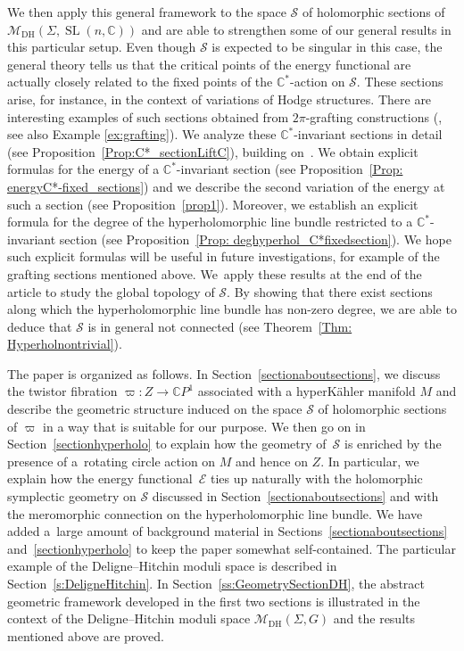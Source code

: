 \documentclass[pdftex]{sigma}
\numberwithin{equation}{section}
\theoremstyle{definition}
\newcommand\C{{\mathbb C}}
\begin{document}
We then apply this general framework to the space $\mathcal S$ of holomorphic sections of $\mathcal{M}_{\mathrm{DH}}(\Sigma,\allowbreak \operatorname{SL}(n,\C))$ and are able to strengthen some of our general results in this particular setup. Even
though $\mathcal S$ is expected to be singular in this case, the general theory tells us that the critical points
of the energy functional are actually closely related to the fixed points of the $\C^*$-action on $\mathcal S$. These sections arise, for instance, in the context of variations of Hodge structures. There are interesting examples of such sections obtained from $2\pi$-grafting constructions (\cite{Hel}, see also Example \ref{ex:grafting}). We analyze
these $\C^*$-invariant sections in detail (see Proposition~\ref{Prop:C*_sectionLiftC}), building on~\cite{CollierWentworth}. We obtain explicit formulas for the energy of a $\C^*$-invariant section
(see Proposition~\ref{Prop: energyC*-fixed_sections}) and we describe the second variation of the energy at such a
section (see Proposition~\ref{prop1}). Moreover, we establish an explicit formula for the degree of the hyperholomorphic
line bundle restricted to a $\C^*$-invariant section (see Proposition~\ref{Prop: deghyperhol_C*fixedsection}). We hope such explicit formulas will be useful in future investigations, for example of the grafting sections mentioned above. We~apply these results at the end of the article to study the global topology of $\mathcal S$. By showing that there exist sections along which the hyperholomorphic line bundle has non-zero
degree, we are able to deduce that $\mathcal S$ is in general not connected (see Theorem~\ref{Thm:
Hyperholnontrivial}).

The paper is organized as follows. In Section~\ref{sectionaboutsections}, we discuss the twistor fibration $\varpi\colon Z
 \longrightarrow \C P^1$ associated with
a hyperK\"ahler manifold $M$ and describe the geometric structure induced on the space $\mathcal S$ of
holomorphic sections of $\varpi$ in a way that is suitable for our purpose. We then go on in Section~\ref{sectionhyperholo} to explain how
the geometry of~$\mathcal S$ is enriched by the presence of a~rotating circle action on $M$ and hence on $Z$. In
particular, we explain how the energy functional~$\mathcal E$ ties up naturally with the holomorphic symplectic
geometry on $\mathcal S$ discussed in Section~\ref{sectionaboutsections} and with the meromorphic connection on the
hyperholomorphic line bundle. We have added a~large amount of background material in Sections~\ref{sectionaboutsections} and~\ref{sectionhyperholo} to keep the
paper somewhat self-contained. The particular example of the Deligne--Hitchin moduli space is described in Section~\ref{s:DeligneHitchin}. In
Section~\ref{ss:GeometrySectionDH}, the abstract geometric framework developed in the first two sections is illustrated in the context of
the Deligne--Hitchin moduli space $\mathcal{M}_{\mathrm{DH}}(\Sigma, G)$ and the results mentioned above are proved.
\end{document}
